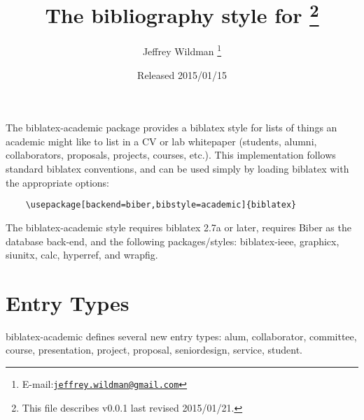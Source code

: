 \documentclass[11pt,letterpaper]{article}
\author{Jeffrey Wildman%
  \thanks{E-mail:\href{mailto:jeffrey.wildman@gmail.com}%
  {\texttt{jeffrey.wildman@gmail.com}}}
}
\title{The \pkg{academic} bibliography style for \pkg{biblatex}%
  \footnote{This file describes v0.0.1 last revised 2015/01/21.}%
}
\date{Released 2015/01/15}
\newcommand{\pkg}[1]{\textsf{#1}}
\newcommand{\entry}[1]{\textsf{#1}}
\begin{document}
\maketitle

The \pkg{biblatex-academic} package provides a \pkg{biblatex} style for lists of things an academic might like to list in a CV or lab whitepaper (students, alumni, collaborators, proposals, projects, courses, etc.).
This implementation follows standard \pkg{biblatex} conventions, and can be used simply by loading \pkg{biblatex} with the appropriate options:
\begin{verbatim}
    \usepackage[backend=biber,bibstyle=academic]{biblatex}
\end{verbatim}
The \pkg{biblatex-academic} style requires \pkg{biblatex} 2.7a or later, requires \pkg{Biber} as the database back-end, and the following packages/styles: \pkg{biblatex-ieee}, \pkg{graphicx}, \pkg{siunitx}, \pkg{calc}, \pkg{hyperref}, and \pkg{wrapfig}.


\section{Entry Types}\label{sec:entry-types}

\pkg{biblatex-academic} defines several new entry types:
\entry{alum},
\entry{collaborator},
\entry{committee},
\entry{course},
\entry{presentation},
\entry{project},
\entry{proposal},
\entry{seniordesign},
\entry{service},
\entry{student}.
\end{document}
